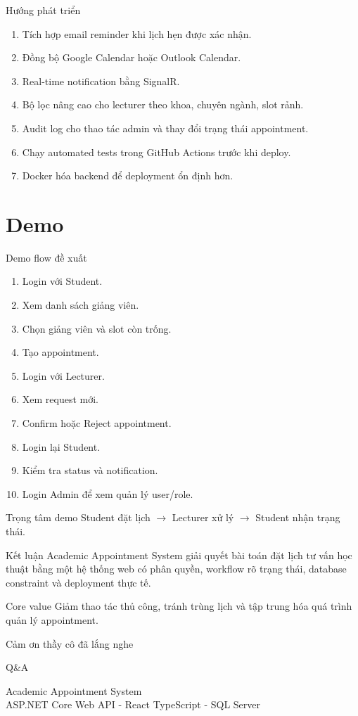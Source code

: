 \documentclass[aspectratio=169,11pt]{beamer}
\begin{document}
\begin{frame}{Hướng phát triển}
  \begin{enumerate}
    \item Tích hợp email reminder khi lịch hẹn được xác nhận.
    \item Đồng bộ Google Calendar hoặc Outlook Calendar.
    \item Real-time notification bằng SignalR.
    \item Bộ lọc nâng cao cho lecturer theo khoa, chuyên ngành, slot rảnh.
    \item Audit log cho thao tác admin và thay đổi trạng thái appointment.
    \item Chạy automated tests trong GitHub Actions trước khi deploy.
    \item Docker hóa backend để deployment ổn định hơn.
  \end{enumerate}
\end{frame}

\section{Demo}

\begin{frame}{Demo flow đề xuất}
  \begin{enumerate}
    \item Login với Student.
    \item Xem danh sách giảng viên.
    \item Chọn giảng viên và slot còn trống.
    \item Tạo appointment.
    \item Login với Lecturer.
    \item Xem request mới.
    \item Confirm hoặc Reject appointment.
    \item Login lại Student.
    \item Kiểm tra status và notification.
    \item Login Admin để xem quản lý user/role.
  \end{enumerate}

  \begin{alertblock}{Trọng tâm demo}
    Student đặt lịch $\rightarrow$ Lecturer xử lý $\rightarrow$ Student nhận trạng thái.
  \end{alertblock}
\end{frame}

\begin{frame}{Kết luận}
  Academic Appointment System giải quyết bài toán đặt lịch tư vấn học thuật bằng một hệ thống web có phân quyền, workflow rõ trạng thái, database constraint và deployment thực tế.

  \begin{block}{Core value}
    Giảm thao tác thủ công, tránh trùng lịch và tập trung hóa quá trình quản lý appointment.
  \end{block}
\end{frame}

\begin{frame}
  \centering
  \Huge Cảm ơn thầy cô đã lắng nghe

  \vspace{0.8cm}
  \Large Q\&A

  \vspace{1cm}
  \normalsize
  Academic Appointment System\\
  ASP.NET Core Web API - React TypeScript - SQL Server
\end{frame}
\end{document}
